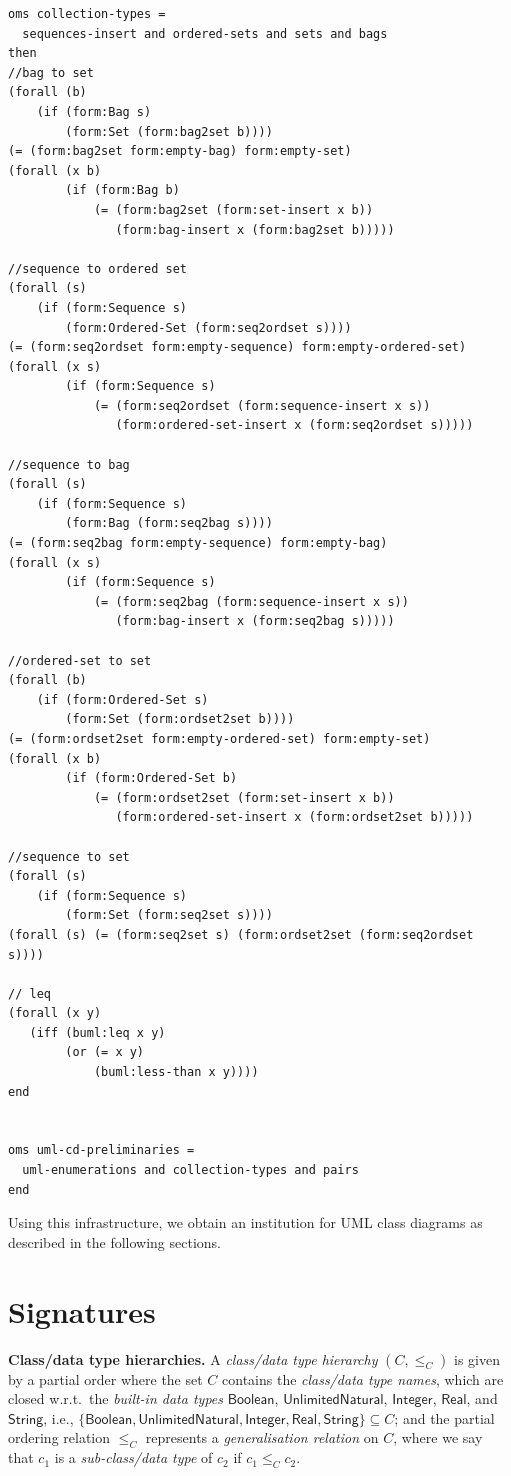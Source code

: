 \documentclass[10pt,fleqn,%
\ifpretendfinal
final%
\else
draft%
\fi,
]{scrreprt}
\begin{document}
\begin{lstlisting}[language=clif,morekeywords={then,with,logic,oms,end},mathescape]
oms collection-types =
  sequences-insert and ordered-sets and sets and bags
then
//bag to set
(forall (b)
	(if (form:Bag s)
	    (form:Set (form:bag2set b))))
(= (form:bag2set form:empty-bag) form:empty-set)
(forall (x b)
        (if (form:Bag b)
            (= (form:bag2set (form:set-insert x b))
               (form:bag-insert x (form:bag2set b)))))

//sequence to ordered set
(forall (s)
	(if (form:Sequence s)
	    (form:Ordered-Set (form:seq2ordset s))))
(= (form:seq2ordset form:empty-sequence) form:empty-ordered-set)
(forall (x s)
        (if (form:Sequence s)
            (= (form:seq2ordset (form:sequence-insert x s))
               (form:ordered-set-insert x (form:seq2ordset s)))))

//sequence to bag
(forall (s)
	(if (form:Sequence s)
	    (form:Bag (form:seq2bag s))))
(= (form:seq2bag form:empty-sequence) form:empty-bag)
(forall (x s)
        (if (form:Sequence s)
            (= (form:seq2bag (form:sequence-insert x s))
               (form:bag-insert x (form:seq2bag s)))))

//ordered-set to set
(forall (b)
	(if (form:Ordered-Set s)
	    (form:Set (form:ordset2set b))))
(= (form:ordset2set form:empty-ordered-set) form:empty-set)
(forall (x b)
        (if (form:Ordered-Set b)
            (= (form:ordset2set (form:set-insert x b))
               (form:ordered-set-insert x (form:ordset2set b)))))

//sequence to set
(forall (s)
	(if (form:Sequence s)
	    (form:Set (form:seq2set s))))
(forall (s) (= (form:seq2set s) (form:ordset2set (form:seq2ordset s))))

// leq
(forall (x y)
   (iff (buml:leq x y)
        (or (= x y)
            (buml:less-than x y))))
end


oms uml-cd-preliminaries =
  uml-enumerations and collection-types and pairs
end

\end{lstlisting}

Using this infrastructure, we obtain an institution for UML class
diagrams as described in the following sections.

\section{Signatures}

\medskip\noindent\textbf{Class/data type hierarchies.}
A \emph{class/data type hierarchy} $(C, {\leq_C})$ is given by a
partial order where the set $C$ contains the \emph{class/data type
  names}, which are closed w.r.t.\ the \emph{built-in data types}
$\mathsf{Boolean}$, $\mathsf{UnlimitedNatural}$, $\mathsf{Integer}$,
$\mathsf{Real}$, and $\mathsf{String}$, i.e.,
$\{ \mathsf{Boolean}, \mathsf{UnlimitedNatural}, \mathsf{Integer},
\mathsf{Real}, \mathsf{String} \} \subseteq C$;
and the partial ordering relation $\leq_C$ represents a
\emph{generalisation relation} on $C$, where we say that $c_1$ is a
\emph{sub-class/data type} of $c_2$ if $c_1 \leq_C c_2$.
\end{document}
